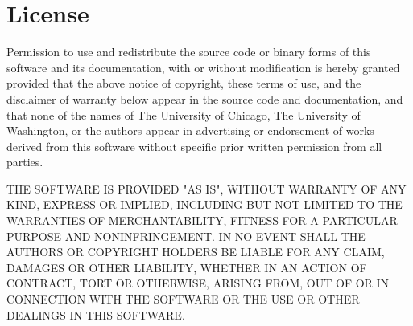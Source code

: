 \clearpage  
\setcounter{page}{1} 
\tableofcontents   
\clearpage   

\section*{License}

\bigskip
{} 


\bigskip\noindent
   Permission to use and redistribute the source code or binary forms of
   this software and its documentation, with or without modification is
   hereby granted provided that the above notice of copyright, these
   terms of use, and the disclaimer of warranty below appear in the
   source code and documentation, and that none of the names of The
   University of Chicago, The University of Washington, or the authors
   appear in advertising or endorsement of works derived from this
   software without specific prior written permission from all parties.

\medskip\noindent
   THE SOFTWARE IS PROVIDED "AS IS", WITHOUT WARRANTY OF ANY KIND,
   EXPRESS OR IMPLIED, INCLUDING BUT NOT LIMITED TO THE WARRANTIES OF
   MERCHANTABILITY, FITNESS FOR A PARTICULAR PURPOSE AND NONINFRINGEMENT.
   IN NO EVENT SHALL THE AUTHORS OR COPYRIGHT HOLDERS BE LIABLE FOR ANY
   CLAIM, DAMAGES OR OTHER LIABILITY, WHETHER IN AN ACTION OF CONTRACT,
   TORT OR OTHERWISE, ARISING FROM, OUT OF OR IN CONNECTION WITH THE
   SOFTWARE OR THE USE OR OTHER DEALINGS IN THIS SOFTWARE.

\clearpage
\setcounter{page}{1}  


